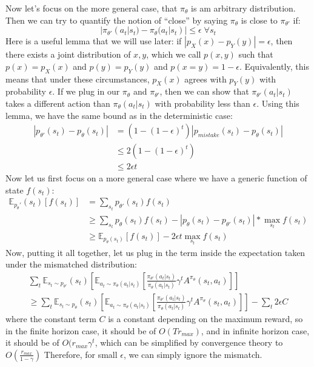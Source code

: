 Now let's focus on the more general case, that $\pi_\theta$ is am arbitrary distribution. Then we can try to quantify the notion of ``close'' by saying $\pi_\theta$ is close to $\pi_{\theta'}$ if:
$$|\pi_{\theta'}(a_t|s_t) - \pi_\theta(a_t|s_t)| \leq \epsilon \; \forall s_t$$
Here is a useful lemma that we will use later: if $|p_X(x) - p_Y(y)| = \epsilon$, then there exists a joint distribution of $x,y$, which we call $p(x,y)$ such that $p(x) = p_X(x)$ and $p(y) = p_Y(y)$ and $p(x=y) = 1-\epsilon$. Equivalently, this means that under these circumstances, $p_X(x)$ agrees with $p_Y(y)$ with probability $\epsilon$. If we plug in our $\pi_\theta$ and $\pi_{\theta'}$, then we can show that $\pi_{\theta'}(a_t|s_t)$ takes a different action than $\pi_\theta(a_t|s_t)$ with probability less than $\epsilon$. Using this lemma, we have the same bound as in the deterministic case:
\begin{align*}
  |p_{\theta'}(s_t) - p_\theta(s_t)| &= (1-(1-\epsilon)^t)|p_{mistake}(s_t) - p_\theta(s_t)|\\
  &\leq 2(1-(1-\epsilon)^t)\\
  &\leq2\epsilon t
\end{align*}
Now let us first focus on a more general case where we have a generic function of state $f(s_t)$:
\begin{align*}
    \mathbb{E}_{p_\theta'}(s_t)[f(s_t)] &= \sum_{s_t}p_{\theta'}(s_t)f(s_t)\\
    &\geq \sum_{s_t}p_\theta(s_t)f(s_t) - |p_\theta(s_t) - p_{\theta'}(s_t)|*\max_{s_t}f(s_t)\\
    &\geq \mathbb{E}_{p_\theta(s_t)}[f(s_t)] - 2\epsilon t\max_{s_t}f(s_t)
\end{align*}
Now, putting it all together, let us plug in the term inside the expectation taken under the mismatched distribution:
\begin{multline}
    \sum_t\mathbb{E}_{s_t\sim p_{\theta'}}(s_t)\left[\mathbb{E}_{a_t\sim \pi_\theta(a_t|s_t)}\left[\frac{\pi_{\theta'}(a_t|s_t)}{\pi_\theta(a_t|s_t)}\gamma^t A^{\pi_\theta}(s_t,a_t)\right]\right]\\
    \geq \sum_t\mathbb{E}_{s_t\sim p_{\theta}}(s_t)\left[\mathbb{E}_{a_t\sim \pi_\theta(a_t|s_t)}\left[\frac{\pi_{\theta'}(a_t|s_t)}{\pi_\theta(a_t|s_t)}\gamma^t A^{\pi_\theta}(s_t,a_t)\right]\right] - \sum_t 2\epsilon C
\end{multline}
where the constant term $C$ is a constant depending on the maximum reward, so in the finite horizon case, it should be of $O(Tr_{max})$, and in infinite horizon case, it should be of $O(r_{max}\gamma^t$, which can be simplified by convergence theory to $O(\frac{r_{max}}{1-\gamma})$ Therefore, for small $\epsilon$, we can simply ignore the mismatch. 

